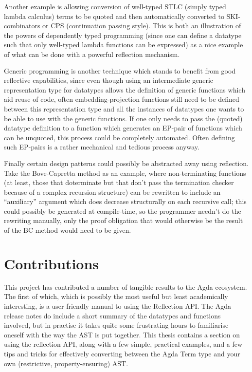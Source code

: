 \documentclass[a4paper]{article}
\begin{document}
Another example is allowing conversion of well-typed STLC (simply typed lambda calculus) terms to be quoted and
then automatically converted to SKI-combinators or CPS (continuation passing style). This is both an illustration of
the powers of dependently typed programming (since one can define a datatype such that only well-typed lambda
functions can be expressed) as a nice example of what can be done with a powerful reflection mechanism.

Generic programming is another technique which stands to benefit from good reflective capabilities, since even
though using an intermediate generic representation type for datatypes allows the definition of generic functions
which aid reuse of code, often embedding-projection functions still need to be defined between this representation type
and all the instances of datatypes one wants to be able to use with the generic functions. If one only needs to
pass the (quoted) datatype definition to a function which generates an EP-pair of functions which can be unquoted,
this process could be completely automated. Often defining such EP-pairs is a rather mechanical and tedious process
anyway.

Finally certain design patterns could possibly be abstracted away using reflection. Take the Bove-Capretta method
as an example, where non-terminating functions (at least, those that doterminate but that don't pass the
termination checker because of a complex recursion structure) can be rewritten to include an ``auxiliary'' argument
which does decrease structurally on each recursive call; this could possibly be generated at compile-time, so
the programmer needn't do the rewriting manually, only the proof obligation that would otherwise be the result of the
BC method would need to be given.


\section{Contributions}


This project has contributed a number of tangible results to the Agda ecosystem. The first of which, which is possibly
the most useful but least academically interesting, is a user-friendly manual to using the Reflection API. The Agda
release notes do include a short summary of the datatypes and functions involved, but in practise it takes quite some
frustrating hours to familiarise oneself with the way the AST is put together. This thesis contains a section on
using the reflection API, along with a few simple, practical examples, and a few tips and tricks for effectively
converting between the Agda Term type and your own (restrictive, property-ensuring) AST.
\end{document}
